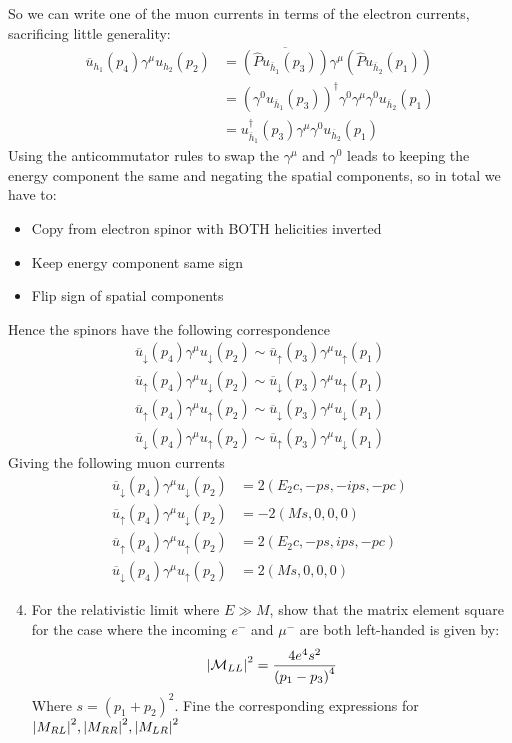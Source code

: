 \documentclass[12pt]{article}
\renewcommand{\bar}{\overline}
\newcommand{\M}{\mathcal{M}}
\begin{document}
So we can write one of the muon currents in terms of the electron currents, sacrificing little generality:
\begin{align*}
  \bar{u}_{h_1}(p_4)\gamma^\mu u_{h_2}(p_2)&=
  \bar{(\hat{P}u_{\bar{h}_1}(p_3))}\gamma^\mu(\hat{P}u_{\bar{h}_2}(p_1))\\
  &={(\gamma^0u_{\bar{h}_1}(p_3))}^\dag
  \gamma^0\gamma^\mu\gamma^0u_{\bar{h}_2}(p_1)\\
  &=u^\dag_{\bar{h}_1}(p_3)\gamma^\mu\gamma^0u_{\bar{h}_2}(p_1)
\end{align*}
Using the anticommutator rules to swap the $\gamma^\mu$ and $\gamma^0$ leads to keeping the energy component the same and negating the spatial components, so in total we have to:
\begin{itemize}
\item Copy from electron spinor with BOTH helicities inverted
\item Keep energy component same sign
\item Flip sign of spatial components 
\end{itemize}
Hence the spinors have the following correspondence
\begin{align*}
  \bar{u}_\downarrow(p_4)\gamma^\mu u_\downarrow(p_2)\sim
  \bar{u}_\uparrow(p_3)\gamma^\mu u_\uparrow(p_1)\\
  \bar{u}_\uparrow(p_4)\gamma^\mu u_\downarrow(p_2)\sim
  \bar{u}_\downarrow(p_3)\gamma^\mu u_\uparrow(p_1)\\
  \bar{u}_\uparrow(p_4)\gamma^\mu u_\uparrow(p_2)\sim
  \bar{u}_\downarrow(p_3)\gamma^\mu u_\downarrow(p_1)\\
  \bar{u}_\downarrow(p_4)\gamma^\mu u_\uparrow(p_2)\sim
  \bar{u}_\uparrow(p_3)\gamma^\mu u_\downarrow(p_1)
\end{align*}
Giving the following muon currents
\begin{equation}
  \label{eq:p3c}
  \boxed{
    \begin{aligned}
      \bar{u}_\downarrow(p_4)\gamma^\mu u_\downarrow(p_2)&=2(E_2c,-ps,-ips,-pc)\\
      \bar{u}_\uparrow(p_4)\gamma^\mu u_\downarrow(p_2)&=-2(Ms,0,0,0)\\
      \bar{u}_\uparrow(p_4)\gamma^\mu u_\uparrow(p_2)&=2(E_2c,-ps,ips,-pc)\\
      \bar{u}_\downarrow(p_4)\gamma^\mu u_\uparrow(p_2)&=2(Ms,0,0,0)
    \end{aligned}
  }
\end{equation}
\newpage
\begin{problem}
  \begin{enumerate}[label = (\alph*)]
    \setcounter{enumi}{3}
  \item For the relativistic limit where $E\gg M$, show that the matrix element square for the case where the incoming $e^-$ and $\mu^-$ are both left-handed is given by:
    \begin{align*}
      \abs{\M_{LL}}^2=\frac{4e^4s^2}{{(p_1-p_3)}^4}
    \end{align*}
    Where $s={(p_1+p_2)}^2$. Fine the corresponding expressions for $\abs{M_{RL}}^2, \abs{M_{RR}}^2, \abs{M_{LR}}^2$
  \end{enumerate}
\end{problem}
\end{document}
